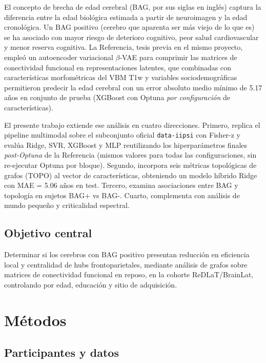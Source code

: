 \documentclass[12pt,a4paper]{article}
\begin{document}
El concepto de brecha de edad cerebral (BAG, por sus siglas en inglés) captura la diferencia
entre la edad biológica estimada a partir de neuroimagen y la edad cronológica. Un BAG positivo
(cerebro que aparenta ser más viejo de lo que es) se ha asociado con mayor riesgo de deterioro
cognitivo, peor salud cardiovascular y menor reserva cognitiva. La Referencia, tesis previa en
el mismo proyecto, empleó un autoencoder variacional $\beta$-VAE para comprimir las matrices de
conectividad funcional en representaciones latentes, que combinadas con características
morfométricas del VBM T1w y variables sociodemográficas permitieron predecir la edad cerebral
con un error absoluto medio mínimo de 5.17 años en conjunto de prueba (XGBoost con Optuna
\emph{por configuración} de características).

El presente trabajo extiende ese análisis en cuatro direcciones. Primero, replica el pipeline
multimodal sobre el subconjunto oficial \texttt{data-iipsi} con Fisher-z y evalúa Ridge, SVR,
XGBoost y MLP reutilizando los hiperparámetros finales \emph{post-Optuna} de la Referencia
(mismos valores para todas las configuraciones, sin re-ejecutar Optuna por bloque). Segundo, incorpora seis métricas
topológicas de grafos (TOPO) al vector de características, obteniendo un modelo híbrido Ridge
con MAE = 5.06 años en test. Tercero, examina asociaciones entre BAG y topología en sujetos
BAG+ vs BAG-. Cuarto, complementa con análisis de mundo pequeño y criticalidad espectral.

\subsection{Objetivo central}

Determinar si los cerebros con BAG positivo presentan reducción en eficiencia local y
centralidad de hubs frontoparietales, mediante análisis de grafos sobre matrices de
conectividad funcional en reposo, en la cohorte ReDLaT/BrainLat, controlando por edad,
educación y sitio de adquisición.

\section{Métodos}

\subsection{Participantes y datos}
\end{document}
